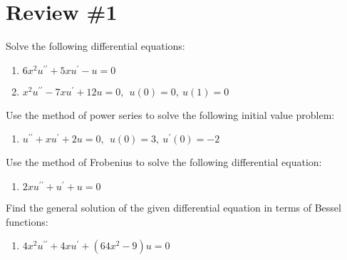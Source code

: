 \chapter{Review \#1}
\label{ch:rev1}
\begin{fullwidth}
Solve the following differential equations:
\begin{enumerate}
\item $6x^2u^{\prime \prime} + 5xu^{\prime} - u  = 0$

\vspace{1.0cm}

\item $x^2u^{\prime \prime} -7xu^{\prime}+12u = 0, \ \ u(0)=0, \ u(1) = 0 $

\vspace{1.0cm}


\end{enumerate}

\noindent Use the method of power series to solve the following initial value problem:
\begin{enumerate}[resume]
\item $u^{\prime \prime} + xu^{\prime} + 2u = 0, \ \ u(0) = 3, \ u^{\prime}(0) = -2$

\vspace{1.0cm}

\end{enumerate}

\vspace{1.0cm}

\noindent Use the method of Frobenius to solve the following differential equation:
\begin{enumerate}[resume]
\item $2xu^{\prime \prime}+u^{\prime} + u = 0$

\vspace{1.0cm}

\end{enumerate}

\noindent Find the general solution of the given differential equation in terms of Bessel functions:

\begin{enumerate}[resume]
\item $4x^2u^{\prime \prime} + 4xu^{\prime} + \left(64x^2-9 \right)u = 0$

\end{enumerate}
\end{fullwidth}
